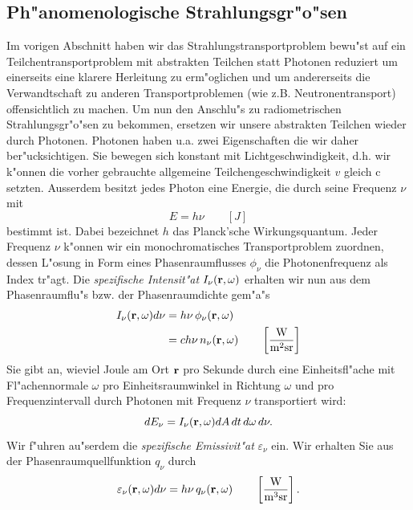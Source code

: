 \documentclass[11pt,a4paper,DIVcalc,BCOR8mm,titlepage,twoside]{scrartcl}
\begin{document}
	\subsection{Ph"anomenologische Strahlungsgr"o"sen}\label{subsec:strahlungsgroessen}
	Im vorigen Abschnitt haben wir das Strahlungstransportproblem bewu"st auf ein Teilchentransportproblem mit abstrakten Teilchen statt Photonen reduziert um einerseits eine klarere Herleitung zu erm"oglichen und um andererseits die Verwandtschaft zu anderen Transportproblemen (wie z.B. Neutronentransport) offensichtlich zu machen. Um nun den Anschlu"s zu radiometrischen Strahlungsgr"o"sen zu bekommen, ersetzen wir unsere abstrakten Teilchen wieder durch Photonen. Photonen haben u.a. zwei Eigenschaften die wir daher ber"ucksichtigen. Sie bewegen sich konstant mit Lichtgeschwindigkeit, d.h. wir k"onnen die vorher gebrauchte allgemeine Teilchengeschwindigkeit $v$ gleich $\text{c}$ setzten. Ausserdem besitzt jedes Photon eine Energie, die durch seine Frequenz $\nu$ mit 
	$$E=h\nu \qquad[J]$$
	bestimmt ist. Dabei bezeichnet $h$ das Planck'sche Wirkungsquantum.
	Jeder Frequenz $\nu$ k"onnen wir ein monochromatisches Transportproblem zuordnen, dessen L"osung in Form eines Phasenraumflusses $\phi_\nu$ die Photonenfrequenz als Index tr"agt.
	Die {\em spezifische Intensit"at} $I_\nu(\mathbf{r},\omega)$ erhalten wir nun aus dem Phasenraumflu"s bzw. der Phasenraumdichte gem"a"s
	\begin{align}\label{eq:intensity_def}
		I_\nu(\mathbf{r},\omega)d\nu & = h\nu\,\phi_\nu(\mathbf{r},\omega)\\
		                       & = c h\nu\,n_\nu(\mathbf{r},\omega) \qquad \left[\frac{\text{W}}{\text{m}^2\text{sr}}\right] \nonumber
	\end{align}
	Sie gibt an, wieviel Joule am Ort $\mathbf{r}$ pro Sekunde durch eine Einheitsfl"ache mit Fl"achennormale $\omega$ pro Einheitsraumwinkel in Richtung $\omega$ und pro Frequenzintervall durch Photonen mit Frequenz $\nu$ transportiert wird:
	$$dE_\nu=I_\nu(\mathbf{r},\omega) dA\,dt\,d\omega\,d\nu.$$
	Wir f"uhren au"serdem die {\em spezifische Emissivit"at} $\varepsilon_\nu$ ein. Wir erhalten Sie aus der Phasenraumquellfunktion $q_\nu$ durch
	\begin{equation}\label{eq:emissivity_def}
		\varepsilon_\nu(\mathbf{r},\omega)d\nu = h\nu\,q_\nu(\mathbf{r},\omega) \qquad \left[\frac{\text{W}}{\text{m}^3\text{sr}}\right].
	\end{equation}
	
\end{document}
